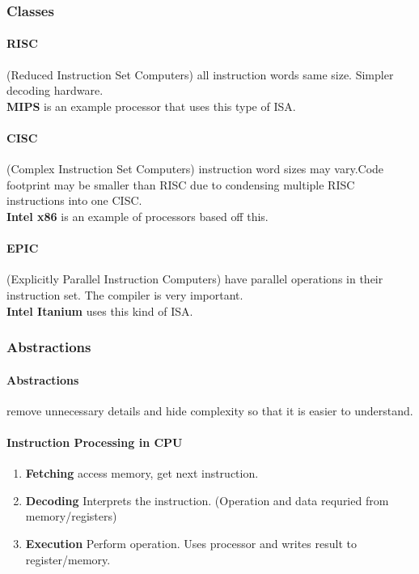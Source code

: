 \documentclass{article}
\newcommand\tab[1][0.5cm]{\hspace*{#1}}
\begin{document}
		\subsubsection*{Classes}
			\paragraph{RISC} (Reduced Instruction Set Computers) all instruction words same size. Simpler decoding hardware. 
			\\ \tab \textbf{MIPS} is an example processor that uses this type of ISA.

			\paragraph{CISC} (Complex Instruction Set Computers) instruction word sizes may vary.Code footprint may be smaller than RISC due to condensing multiple RISC instructions into one CISC. 
			\\ \tab \textbf{Intel x86} is an example of processors based off this.

			\paragraph{EPIC} (Explicitly Parallel Instruction Computers) have parallel operations in their instruction set. The compiler is very important.
			\\ \tab \textbf{Intel Itanium} uses this kind of ISA.

		\subsubsection*{Abstractions}
			\paragraph{Abstractions} remove unnecessary details and hide complexity so that it is easier to understand. 

			\paragraph{\tab Instruction Processing in CPU}
			\begin{enumerate}
				\item \textbf{Fetching} access memory, get next instruction.
				\item \textbf{Decoding} Interprets the instruction. (Operation and data requried from memory/registers)
				\item \textbf{Execution} Perform operation. Uses processor and writes result to register/memory.
			\end{enumerate}
\end{document}
